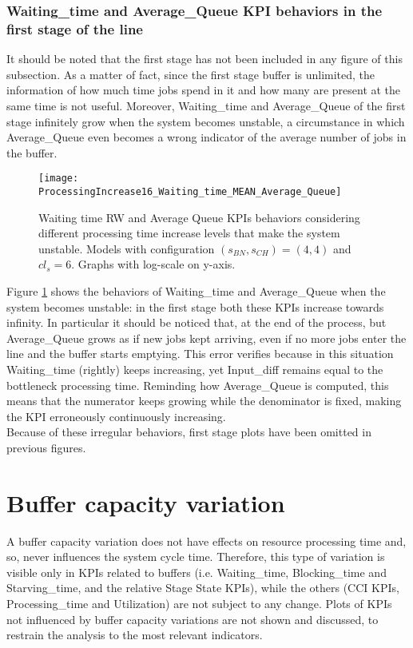 \subsubsection{Waiting\_time and Average\_Queue KPI behaviors in the first stage of the line}
It should be noted that the first stage has not been included in any figure of this subsection. As a matter of fact, since the first stage buffer is unlimited, the information of how much time jobs spend in it and how many are present at the same time is not useful. Moreover, Waiting\_time and Average\_Queue of the first stage infinitely grow when the system becomes unstable, a circumstance in which Average\_Queue even becomes a wrong indicator of the average number of jobs in the buffer.
\begin{figure}[h] 
\centering
\texttt{[image: ProcessingIncrease16\_Waiting\_time\_MEAN\_Average\_Queue]}
\caption[Waiting time RW and Average Queue KPIs behaviors with different processing time increase levels that make the system unstable]{Waiting time RW and Average Queue KPIs behaviors considering different processing time increase levels that make the system unstable. Models with configuration $(s_{BN},s_{CH})=(4,4)$ and $cl_s=6$. Graphs with log-scale on y-axis.}
\label{fig:Waiting time RW and Average Queue KPIs behaviors with different processing time increase levels that make the system unstable}
\end{figure}
Figure \ref{fig:Waiting time RW and Average Queue KPIs behaviors with different processing time increase levels that make the system unstable} shows the behaviors of Waiting\_time and Average\_Queue when the system becomes unstable: in the first stage both these KPIs increase towards infinity. In particular it should be noticed that, at the end of the process, but Average\_Queue grows as if new jobs kept arriving, even if no more jobs enter the line and the buffer starts emptying. This error verifies because in this situation Waiting\_time (rightly) keeps increasing, yet Input\_diff remains equal to the bottleneck processing time. Reminding how Average\_Queue is computed, this means that the numerator keeps growing while the denominator is fixed, making the KPI erroneously continuously increasing. \\Because of these irregular behaviors, first stage plots have been omitted in previous figures. 
\newpage
\section{Buffer capacity variation}
A buffer capacity variation does not have effects on resource processing time and, so, never influences the system cycle time. Therefore, this type of variation is visible only in KPIs related to buffers (i.e. Waiting\_time, Blocking\_time and Starving\_time, and the relative Stage State KPIs), while the others (CCI KPIs, Processing\_time and Utilization) are not subject to any change. Plots of KPIs not influenced by buffer capacity variations are not shown and discussed, to restrain the analysis to the most relevant indicators.
